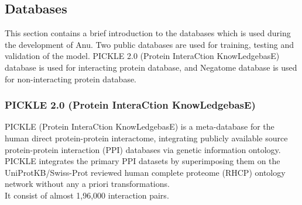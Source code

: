 \documentclass[../main.tex]{subfiles}
\begin{document}


\subsection{Databases}
This section contains a brief introduction to the databases which is used
during the development of Anu. Two public databases are used for training,
testing and validation of the model. PICKLE 2.0 (Protein InteraCtion KnowLedgebasE)
 database is used for interacting protein database, and
Negatome  database is used for non-interacting
protein database.

\subsubsection{PICKLE 2.0 (Protein InteraCtion KnowLedgebasE)}
PICKLE (Protein InteraCtion KnowLedgebasE) is a meta-database for the human direct
protein-protein interactome, integrating publicly available source protein-protein
interaction (PPI) databases via genetic information ontology. PICKLE integrates the
primary PPI datasets by superimposing them on the UniProtKB/Swiss-Prot reviewed
human complete proteome (RHCP) ontology network without any a priori transformations.
\\ It consist of almost 1,96,000 interaction pairs.
\end{document}
